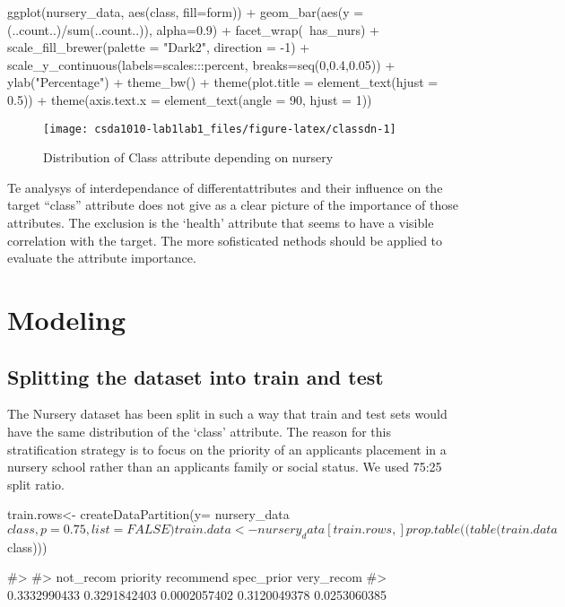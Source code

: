 \begin{Schunk}
\begin{Sinput}
ggplot(nursery_data, aes(class, fill=form)) + 
  geom_bar(aes(y = (..count..)/sum(..count..)), alpha=0.9) +
  facet_wrap(~has_nurs) + 
  scale_fill_brewer(palette = "Dark2", direction = -1) +
  scale_y_continuous(labels=scales:::percent, breaks=seq(0,0.4,0.05)) +
  ylab("Percentage") +
  theme_bw() +
  theme(plot.title = element_text(hjust = 0.5)) +
  theme(axis.text.x = element_text(angle = 90, hjust = 1))
\end{Sinput}
\begin{figure}[h]

\texttt{[image: csda1010-lab1lab1\_files/figure-latex/classdn-1]} \hfill{}

\caption[Distribution of Class attribute depending on nursery]{Distribution of Class attribute depending on nursery}\label{fig:classdn}
\end{figure}
\end{Schunk}

Te analysys of interdependance of differentattributes and their
influence on the target ``class'' attribute does not give as a clear
picture of the importance of those attributes. The exclusion is the
`health' attribute that seems to have a visible correlation with the
target. The more sofisticated nethods should be applied to evaluate the
attribute importance.

\hypertarget{modeling}{%
\section{Modeling}\label{modeling}}

\hypertarget{splitting-the-dataset-into-train-and-test}{%
\subsection{Splitting the dataset into train and
test}\label{splitting-the-dataset-into-train-and-test}}

The Nursery dataset has been split in such a way that train and test
sets would have the same distribution of the `class' attribute. The
reason for this stratification strategy is to focus on the priority of
an applicants placement in a nursery school rather than an applicants
family or social status. We used 75:25 split ratio.

\begin{Schunk}
\begin{Sinput}
train.rows<- createDataPartition(y= nursery_data$class, p=0.75, list = FALSE)
train.data<- nursery_data[train.rows,]
prop.table((table(train.data$class)))
\end{Sinput}
\begin{Soutput}
#> 
#>    not_recom     priority    recommend   spec_prior   very_recom 
#> 0.3332990433 0.3291842403 0.0002057402 0.3120049378 0.0253060385
\end{Soutput}
\end{Schunk}


